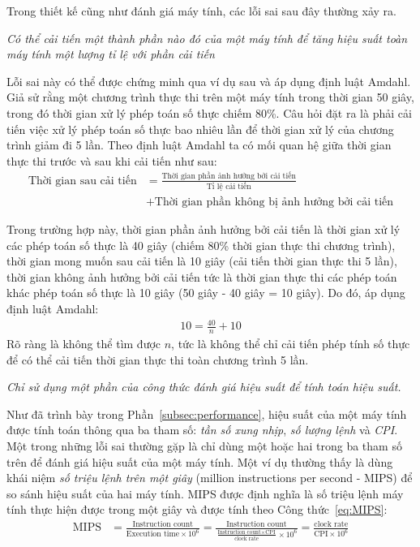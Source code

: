 Trong thiết kế cũng như đánh giá máy tính, các lỗi sai sau đây thường xảy ra.

\begin{pitfall}
\emph{Có thể cải tiến một thành phần nào đó của một máy tính để tăng hiệu suất toàn máy tính một lượng tỉ lệ với phần cải tiến}
\end{pitfall}

Lỗi sai này có thể được chứng minh qua ví dụ sau và áp dụng định luật Amdahl. Giả sử rằng một chương trình thực thi trên một máy tính trong thời gian 50 giây, trong đó thời gian xử lý phép toán số thực chiếm 80\%. Câu hỏi đặt ra là phải cải tiến việc xử lý phép toán số thực bao nhiêu lần để thời gian xử lý của chương trình giảm đi 5 lần. Theo định luật Amdahl ta có mối quan hệ giữa thời gian thực thi trước và sau khi cải tiến như sau:
\begin{align*}
\text{Thời gian sau cải tiến} &= \frac{\text{Thời gian phần ảnh hưởng bởi cải tiến}}{\text{Tỉ lệ cải tiến}}\\ &+ \text{Thời gian phần không bị ảnh hưởng bởi cải tiến}
\end{align*}

Trong trường hợp này, thời gian phần ảnh hưởng bởi cải tiến là thời gian xử lý các phép toán số thực là 40 giây (chiếm 80\% thời gian thực thi chương trình), thời gian mong muốn sau cải tiến là 10 giây (cải tiến thời gian thực thi 5 lần), thời gian không ảnh hưởng bởi cải tiến tức là thời gian thực thi các phép toán khác phép toán số thực là 10 giây (50 giây - 40 giây = 10 giây). Do đó, áp dụng định luật Amdahl:
\begin{align*}
10 = \frac{40}{n} + 10
\end{align*}
Rõ ràng là không thể tìm được $n$, tức là không thể chỉ cải tiến phép tính số thực để có thể cải tiến thời gian thực thi toàn chương trình 5 lần.

\begin{pitfall}
\emph{Chỉ sử dụng một phần của công thức đánh giá hiệu suất để tính toán hiệu suất.}
\end{pitfall}

Như đã trình bày trong Phần~\ref{subsec:performance}, hiệu suất của một máy tính được tính toán thông qua ba tham số: \emph{tần số xung nhịp}, \emph{số lượng lệnh} và \emph{CPI}. Một trong những lỗi sai thường gặp là chỉ dùng một hoặc hai trong ba tham số trên để đánh giá hiệu suất của một máy tính. Một ví dụ thường thấy là dùng khái niệm \emph{số triệu lệnh trên một giây} (million instructions per second - MIPS) để so sánh hiệu suất của hai máy tính. MIPS được định nghĩa là số triệu lệnh máy tính thực hiện được trong một giây và được tính theo Công thức~\ref{eq:MIPS}:
\begin{align}
\label{eq:MIPS}
	\text{MIPS} &= \frac{\text{Instruction count}}{\text{Execution time}\times 10^6}
	= \frac{\text{Instruction count}}{\frac{\text{Instruction count} \times \text{CPI}}{\text{clock rate}}\times 10^6}
	= \frac{\text{clock rate}}{\text{CPI} \times 10^6}
\end{align}

